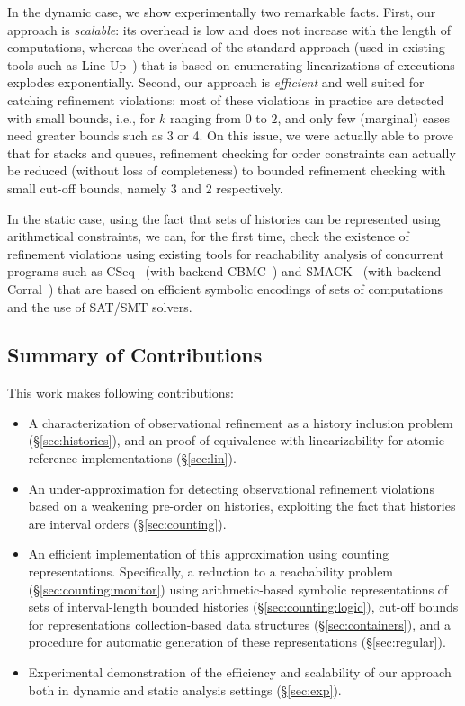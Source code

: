 In the dynamic case, we show experimentally two remarkable facts. First, our
approach is \emph{scalable}: its overhead is low and does not increase with the
length of computations, whereas the overhead of the standard approach (used in
existing tools such as Line-Up~\cite{conf/pldi/BurckhardtDMT10}) that is based on enumerating
linearizations of executions explodes exponentially. Second, our approach is
\emph{efficient} and well suited for catching refinement violations: most of
these violations in practice are detected with small bounds, i.e., for $k$
ranging from 0 to $2$, and only few (marginal) cases need greater bounds such
as 3 or 4. On this issue, we were actually able to prove that for 
stacks and queues, refinement checking for order constraints
can actually be reduced (without loss of completeness) to bounded refinement
checking with small cut-off bounds, namely 3 and 2 respectively.

In the static case, using the fact that sets of histories can be represented
using arithmetical constraints, we can, for the first time, check the existence
of refinement violations using existing tools for reachability analysis of
concurrent programs such as CSeq~\cite{conf/ase/FischerIP13} (with backend CBMC~\cite{conf/tacas/KroeningT14}) and SMACK~\cite{conf/cav/RakamaricE14} (with backend Corral~\cite{conf/cav/LalQL12}) that are based on efficient symbolic
encodings of sets of computations and the use of SAT/SMT solvers.

\subsection{Summary of Contributions}

This work makes following contributions:
\begin{itemize}

  \item A characterization of observational refinement as a history inclusion
  problem (\S\ref{sec:histories}), and an proof of equivalence with
  linearizability for atomic reference implementations (\S\ref{sec:lin}).

  \item An under-approximation for detecting observational refinement
  violations based on a weakening pre-order on histories, exploiting the fact
  that histories are interval orders (\S\ref{sec:counting}).

  \item An efficient implementation of this approximation using counting
  representations. Specifically, a reduction to a reachability problem
  (\S\ref{sec:counting:monitor}) using arithmetic-based symbolic
  representations of sets of interval-length bounded histories
  (\S\ref{sec:counting:logic}), cut-off bounds for representations
  collection-based data structures (\S\ref{sec:containers}), and a procedure
  for automatic generation of these representations (\S\ref{sec:regular}).

  \item Experimental demonstration of the efficiency and scalability of our
  approach both in dynamic and static analysis settings (\S\ref{sec:exp}).

\end{itemize}
